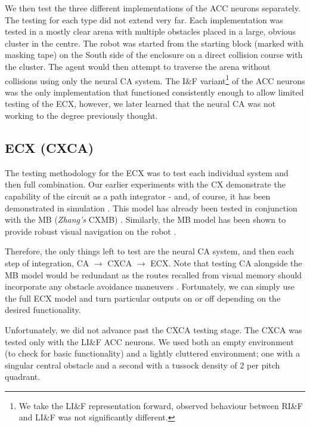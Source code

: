 \documentclass[a4paper,11pt,twoside,openright]{article}
\begin{document}
We then test the three different implementations of the ACC neurons
separately. The testing for each type did not extend very far. Each
implementation was tested in a mostly clear arena with multiple
obstacles placed in a large, obvious cluster in the centre. The robot
was started from the starting block (marked with masking tape) on the
South side of the enclosure on a direct collision course with the
cluster. The agent would then attempt to traverse the arena without
collisions using only the neural CA system. The I\&F
variant\footnote{We take the LI\&F representation forward, observed
  behaviour between RI\&F and LI\&F was not significantly different.}
of the ACC neurons was the only implementation that functioned
consistently enough to allow limited testing of the ECX, however, we
later learned that the neural CA was not working to the degree
previously thought.
\newline\par

\subsection{ECX (CXCA)}
The testing methodology for the ECX was to test each individual system
and then full combination. Our earlier experiments with the CX
demonstrate the capability of the circuit as a path integrator - and,
of course, it has been demonstrated in simulation
\cite{Stone2017}. This model has already been tested in conjunction
with the MB (\textit{Zhang's} CXMB) \cite{Zhang2017}. Similarly, the MB
model has been shown to provide robust visual navigation on the robot
\cite{Mitchell2018}.\newline\par

Therefore, the only things left to test are the neural CA system, and
then each step of integration, CA $\rightarrow$ CXCA $\rightarrow$
ECX. Note that testing CA alongside the MB model would be redundant as
the routes recalled from visual memory should incorporate any obstacle
avoidance maneuvers \cite{Mitchell2018}. Fortunately, we can simply
use the full ECX model and turn particular outputs on or off depending
on the desired functionality.
\newline\par

Unfortunately, we did not advance past the CXCA testing stage. The
CXCA was tested only with the LI\&F ACC neurons. We used both an empty
environment (to check for basic functionality) and a lightly cluttered
environment; one with a singular central obstacle and a second with a
tussock density of 2 per pitch quadrant.
\newline\par
\end{document}
